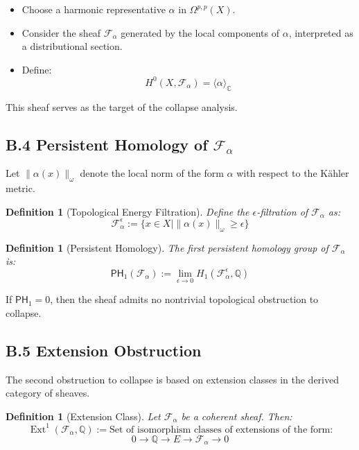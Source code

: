 \documentclass[11pt]{article}
\newtheorem{definition}[theorem]{Definition}
\DeclareMathOperator{\Ext}{Ext}
\begin{document}
\begin{itemize}
  \item Choose a harmonic representative $\alpha$ in $\Omega^{p,p}(X)$.
  \item Consider the sheaf $\mathcal{F}_\alpha$ generated by the local components of $\alpha$, interpreted as a distributional section.
  \item Define:
  \[
  H^0(X, \mathcal{F}_\alpha) = \langle \alpha \rangle_\mathbb{C}
  \]
\end{itemize}

This sheaf serves as the target of the collapse analysis.

\subsection*{B.4 Persistent Homology of $\mathcal{F}_\alpha$}

Let $\| \alpha(x) \|_\omega$ denote the local norm of the form $\alpha$ with respect to the Kähler metric.

\begin{definition}[Topological Energy Filtration]
Define the $\epsilon$-filtration of $\mathcal{F}_\alpha$ as:
\[
\mathcal{F}_\alpha^{\epsilon} := \{ x \in X \mid \| \alpha(x) \|_\omega \geq \epsilon \}
\]
\end{definition}

\begin{definition}[Persistent Homology]
The first persistent homology group of $\mathcal{F}_\alpha$ is:
\[
\mathsf{PH}_1(\mathcal{F}_\alpha) := \lim_{\epsilon \to 0} H_1(\mathcal{F}_\alpha^\epsilon, \mathbb{Q})
\]
\end{definition}

If $\mathsf{PH}_1 = 0$, then the sheaf admits no nontrivial topological obstruction to collapse.

\subsection*{B.5 Extension Obstruction}

The second obstruction to collapse is based on extension classes in the derived category of sheaves.

\begin{definition}[Extension Class]
Let $\mathcal{F}_\alpha$ be a coherent sheaf. Then:
\[
\Ext^1(\mathcal{F}_\alpha, \mathbb{Q}) := \text{Set of isomorphism classes of extensions of the form:}
\]
\[
0 \to \mathbb{Q} \to E \to \mathcal{F}_\alpha \to 0
\]
\end{definition}
\end{document}
